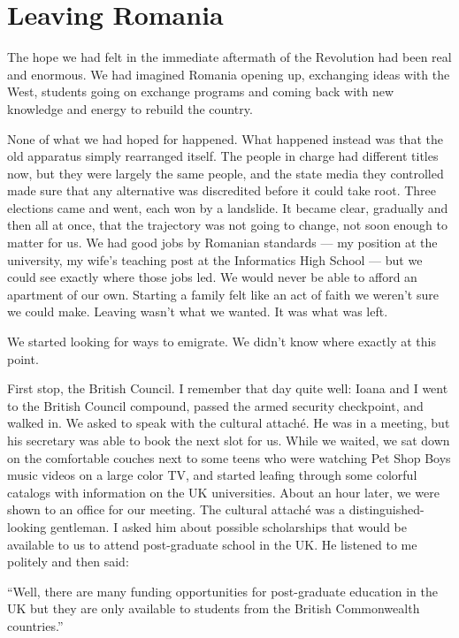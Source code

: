 \documentclass[12pt]{book}
\begin{document}
\section{Leaving Romania}

The hope we had felt in the immediate aftermath of the Revolution had
been real and enormous. We had imagined Romania opening up, exchanging
ideas with the West, students going on exchange programs and coming back
with new knowledge and energy to rebuild the country.

None of what we had hoped for happened. What happened instead was that
the old apparatus simply rearranged itself. The people in charge had
different titles now, but they were largely the same people, and the
state media they controlled made sure that any alternative was
discredited before it could take root. Three elections came and went,
each won by a landslide. It became clear, gradually and then all at
once, that the trajectory was not going to change, not soon enough to
matter for us. We had good jobs by Romanian standards --- my position at
the university, my wife's teaching post at the Informatics High School
--- but we could see exactly where those jobs led. We would never be
able to afford an apartment of our own. Starting a family felt like an
act of faith we weren't sure we could make. Leaving wasn't what we
wanted. It was what was left.

We started looking for ways to emigrate. We didn't know where exactly at
this point.

First stop, the British Council. I remember that day quite well: Ioana
and I went to the British Council compound, passed the armed security
checkpoint, and walked in. We asked to speak with the cultural attaché.
He was in a meeting, but his secretary was able to book the next slot
for us. While we waited, we sat down on the comfortable couches next to
some teens who were watching Pet Shop Boys music videos on a large color
TV, and started leafing through some colorful catalogs with information
on the UK universities. About an hour later, we were shown to an office
for our meeting. The cultural attaché was a distinguished-looking
gentleman. I asked him about possible scholarships that would be
available to us to attend post-graduate school in the UK. He listened to
me politely and then said:

``Well, there are many funding opportunities for post-graduate education
in the UK but they are only available to students from the British
Commonwealth countries.''
\end{document}
